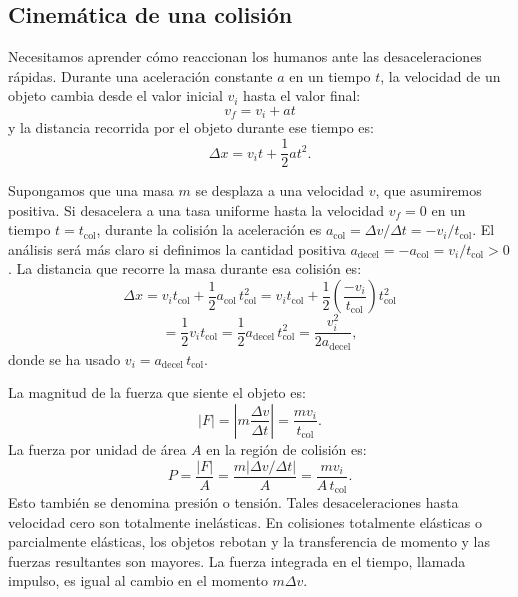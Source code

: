 \documentclass[12pt]{book}
\begin{document}
\subsection{Cinemática de una colisión}

Necesitamos aprender cómo reaccionan los humanos ante las desaceleraciones rápidas. Durante una aceleración constante $a$ en un tiempo $t$, la velocidad de un objeto cambia desde el valor inicial $v_i$ hasta el valor final:
\begin{equation}
v_f = v_i + at
\label{eq:3.102}
\end{equation}
y la distancia recorrida por el objeto durante ese tiempo es:
\begin{equation}
\Delta x = v_i t + \frac{1}{2}at^2.
\label{eq:3.103}
\end{equation}

Supongamos que una masa $m$ se desplaza a una velocidad $v$, que asumiremos positiva. Si desacelera a una tasa uniforme hasta la velocidad $v_f = 0$ en un tiempo $t = t_{\text{col}}$, durante la colisión la aceleración es $a_{\text{col}} = \Delta v / \Delta t = -v_i / t_{\text{col}}$. El análisis será más claro si definimos la cantidad positiva $a_{\text{decel}} = -a_{\text{col}} = v_i / t_{\text{col}} > 0$. La distancia que recorre la masa durante esa colisión es:
\begin{equation}
\Delta x = v_i t_{\text{col}} + \frac{1}{2}a_{\text{col}}\,t_{\text{col}}^2 = v_i t_{\text{col}} + \frac{1}{2}\left(\frac{-v_i}{t_{\text{col}}}\right)t_{\text{col}}^2
\label{eq:3.104}
\end{equation}
\begin{equation}
= \frac{1}{2}v_i t_{\text{col}} = \frac{1}{2}a_{\text{decel}}\,t_{\text{col}}^2 = \frac{v_i^2}{2a_{\text{decel}}},
\label{eq:3.105}
\end{equation}
donde se ha usado $v_i = a_{\text{decel}}\,t_{\text{col}}$.

La magnitud de la fuerza que siente el objeto es:
\begin{equation}
|F| = \left|m\frac{\Delta v}{\Delta t}\right| = \frac{m v_i}{t_{\text{col}}}.
\label{eq:3.106}
\end{equation}
La fuerza por unidad de área $A$ en la región de colisión es:
\begin{equation}
P = \frac{|F|}{A} = \frac{m|\Delta v/\Delta t|}{A} = \frac{m v_i}{A\,t_{\text{col}}}.
\label{eq:3.107}
\end{equation}
Esto también se denomina presión o tensión. Tales desaceleraciones hasta velocidad cero son totalmente inelásticas. En colisiones totalmente elásticas o parcialmente elásticas, los objetos rebotan y la transferencia de momento y las fuerzas resultantes son mayores. La fuerza integrada en el tiempo, llamada impulso, es igual al cambio en el momento $m\Delta v$.
\end{document}
